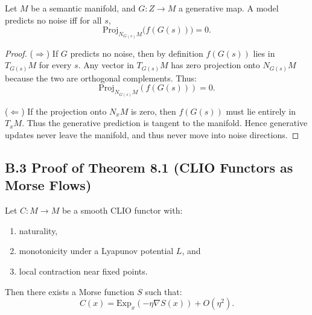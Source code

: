 \documentclass[11pt,a4paper,twocolumn]{article}
\begin{document}
\begin{theorem*}
Let $M$ be a semantic manifold, and $G: Z \to M$ a generative map.
A model predicts no noise iff for all $s$,
\[
\mathrm{Proj}_{N_{G(s)}M}\big(f(G(s))\big) = 0.
\]
\end{theorem*}

\begin{proof}
($\Rightarrow$)
If $G$ predicts no noise, then by definition $f(G(s))$ lies in $T_{G(s)}M$
for every $s$. Any vector in $T_{G(s)}M$ has zero projection onto
$N_{G(s)}M$ because the two are orthogonal complements.
Thus:
\[
\mathrm{Proj}_{N_{G(s)}M}(f(G(s))) = 0.
\]

($\Leftarrow$)
If the projection onto $N_xM$ is zero, then $f(G(s))$ must lie entirely
in $T_xM$. Thus the generative prediction is tangent to the manifold.
Hence generative updates never leave the manifold, and thus never move
into noise directions.
\end{proof}


\subsection*{B.3 Proof of Theorem 8.1 (CLIO Functors as Morse Flows)}

\begin{theorem*}
Let $C: M \to M$ be a smooth CLIO functor with:
\begin{enumerate}
\item naturality,
\item monotonicity under a Lyapunov potential $L$, and
\item local contraction near fixed points.
\end{enumerate}
Then there exists a Morse function $S$ such that:
\[
C(x) = \mathrm{Exp}_x(-\eta \nabla S(x)) + O(\eta^2).
\]
\end{theorem*}
\end{document}
